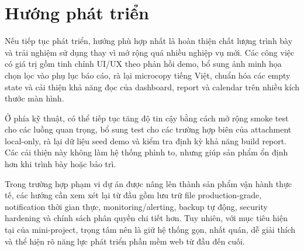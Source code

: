 \section{Hướng phát triển}
Nếu tiếp tục phát triển, hướng phù hợp nhất là hoàn thiện chất lượng trình bày và trải nghiệm sử dụng thay vì mở rộng quá nhiều nghiệp vụ mới. Các công việc có giá trị gồm tinh chỉnh UI/UX theo phản hồi demo, bổ sung ảnh minh họa chọn lọc vào phụ lục báo cáo, rà lại microcopy tiếng Việt, chuẩn hóa các empty state và cải thiện khả năng đọc của dashboard, report và calendar trên nhiều kích thước màn hình.

Ở phía kỹ thuật, có thể tiếp tục tăng độ tin cậy bằng cách mở rộng smoke test cho các luồng quan trọng, bổ sung test cho các trường hợp biên của attachment local-only, rà lại dữ liệu seed demo và kiểm tra định kỳ khả năng build report. Các cải thiện này không làm hệ thống phình to, nhưng giúp sản phẩm ổn định hơn khi trình bày hoặc bảo trì.

Trong trường hợp phạm vi dự án được nâng lên thành sản phẩm vận hành thực tế, các hướng cần xem xét lại từ đầu gồm lưu trữ file production-grade, notification thời gian thực, monitoring/alerting, backup tự động, security hardening và chính sách phân quyền chi tiết hơn. Tuy nhiên, với mục tiêu hiện tại của mini-project, trọng tâm nên là giữ hệ thống gọn, nhất quán, dễ giải thích và thể hiện rõ năng lực phát triển phần mềm web từ đầu đến cuối.
